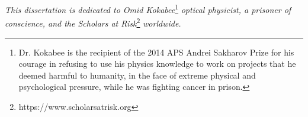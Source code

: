 
\newenvironment{dedication}
{
   \cleardoublepage
   \thispagestyle{empty}
  \vspace*{\stretch{2}}
   \centering\begin{minipage}[t]{0.72\textwidth}
}%
{
   \end{minipage}
   \vspace*{\stretch{3}}
   \clearpage
}
     
     
     
\begin{dedication}
\justify
\textit{This dissertation is dedicated to Omid Kokabee}\footnote{Dr. Kokabee is the recipient of the 2014 APS Andrei Sakharov Prize for his courage in refusing to use his physics knowledge to work on projects that he deemed harmful to humanity, in the face of extreme physical and psychological pressure, while he was fighting cancer in prison.} \textit{optical physicist, a prisoner of conscience, and the Scholars at Risk}\footnote{https://www.scholarsatrisk.org} \textit{worldwide.}
\end{dedication}





 
 
 
